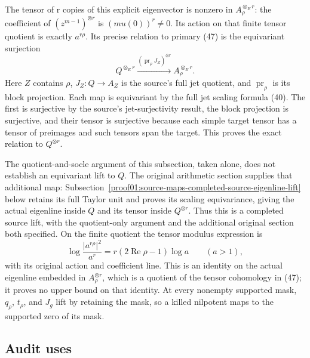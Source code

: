 The tensor of r copies of this explicit eigenvector is nonzero in \(A_\rho^{\otimes_E r}\): the coefficient of \((z^{m-1})^{\otimes r}\) is \((m u(0))^r\ne0\). Its action on that finite tensor quotient is exactly \(a^{r\rho}\). Its precise relation to primary (47) is the equivariant surjection \[
Q^{\otimes_E r}\xrightarrow{(\operatorname{pr}_\rho J_Z)^{\otimes r}}
A_\rho^{\otimes_E r}.
\] Here \(Z\) contains \(\rho\), \(J_Z:Q\to A_Z\) is the source's full jet quotient, and \(\operatorname{pr}_\rho\) is its block projection. Each map is equivariant by the full jet scaling formula (40). The first is surjective by the source's jet-surjectivity result, the block projection is surjective, and their tensor is surjective because each simple target tensor has a tensor of preimages and such tensors span the target. This proves the exact relation to \(Q^{\otimes r}\).

The quotient-and-socle argument of this subsection, taken alone, does not establish an equivariant lift to \(Q\). The original arithmetic section supplies that additional map: Subsection~\ref{proof01:source-maps-completed-source-eigenline-lift} below retains its full Taylor unit and proves its scaling equivariance, giving the actual eigenline inside \(Q\) and its tensor inside \(Q^{\otimes r}\). Thus this is a completed source lift, with the quotient-only argument and the additional original section both specified. On the finite quotient the tensor modulus expression is \[
\log\frac{|a^{r\rho}|^2}{a^r}=r(2\operatorname{Re}\rho-1)\log a
\qquad(a>1),
\] with its original action and coefficient line. This is an identity on the actual eigenline embedded in \(A_\rho^{\otimes r}\), which is a quotient of the tensor cohomology in (47); it proves no upper bound on that identity. At every nonempty supported mask, \(q_\rho\), \(t_\rho\), and \(J_g\) lift by retaining the mask, so a killed nilpotent maps to the supported zero of its mask.

\subsection{Audit uses}\label{proof01:source-maps-audit-uses}

